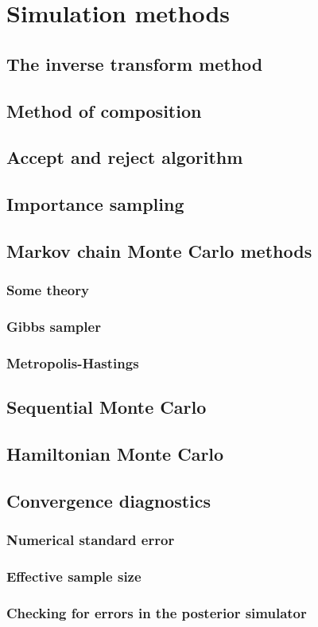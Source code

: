 \chapter{Simulation methods}\label{chap5}

\section{The inverse transform method}\label{sec51}

\section{Method of composition}\label{sec52}

\section{Accept and reject algorithm}\label{sec53}

\section{Importance sampling}\label{sec54}

\section{Markov chain Monte Carlo methods}\label{sec55}

\subsection{Some theory}\label{sec551}

\subsection{Gibbs sampler}\label{sec552}

\subsection{Metropolis-Hastings}\label{sec553}

\section{Sequential Monte Carlo}\label{sec56}

\section{Hamiltonian Monte Carlo}\label{sec57}

\section{Convergence diagnostics}\label{sec58}
\subsection{Numerical standard error}
\subsection{Effective sample size}
\subsection{Checking for errors in the posterior simulator}
\cite{geweke2004getting}